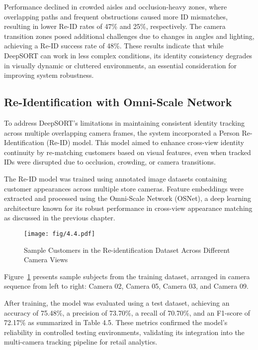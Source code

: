 {Performance declined in crowded aisles and occlusion-heavy zones, where overlapping paths and frequent obstructions caused more ID mismatches, resulting in lower Re-ID rates of 47\% and 25\%, respectively. The camera transition zones posed additional challenges due to changes in angles and lighting, achieving a Re-ID success rate of 48\%. These results indicate that while DeepSORT can work in less complex conditions, its identity consistency degrades in visually dynamic or cluttered environments, an essential consideration for improving system robustness.

\subsection{Re-Identification with Omni-Scale Network}

To address DeepSORT’s limitations in maintaining consistent identity tracking across multiple overlapping camera frames, the system incorporated a Person Re-Identification (Re-ID) model. This model aimed to enhance cross-view identity continuity by re-matching customers based on visual features, even when tracked IDs were disrupted due to occlusion, crowding, or camera transitions.

The Re-ID model was trained using annotated image datasets containing customer appearances across multiple store cameras. Feature embeddings were extracted and processed using the Omni-Scale Network (OSNet), a deep learning architecture known for its robust performance in cross-view appearance matching as discussed in the previous chapter.

\begin{figure}[H]
	\caption[Sample Customers in the Re-identification Dataset Across Different Camera Views]{\newline \newline Sample Customers in the Re-identification Dataset Across Different Camera Views}
	\centering
	\texttt{[image: fig/4.4.pdf]}
	\label{fig:4.4}
\end{figure}

Figure~\ref{fig:4.4} presents sample subjects from the training dataset, arranged in camera sequence from left to right: Camera 02, Camera 05, Camera 03, and Camera 09.

After training, the model was evaluated using a test dataset, achieving an accuracy of 75.48\%, a precision of 73.70\%, a recall of 70.70\%, and an F1-score of 72.17\% as summarized in Table 4.5. These metrics confirmed the model’s reliability in controlled testing environments, validating its integration into the multi-camera tracking pipeline for retail analytics.

}
